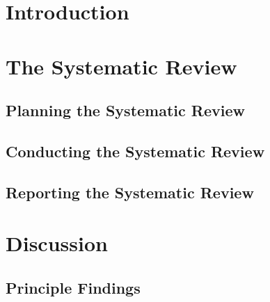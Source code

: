 \documentclass{sig-alternate}
\begin{document}
\linespread{0.87}



\linespread{0.87}
\section{Introduction}
	

%	
%		
	
\linespread{0.87}
\section{The Systematic Review}\label{method}
	
	\linespread{0.87}
	\subsection{Planning the Systematic Review\label{planning}}
		
		\linespread{0.87}
	\subsection{Conducting the Systematic Review\label{conducting}}
		
%			
\linespread{0.87}
	\subsection{Reporting the Systematic Review\label{reporting}}
		
\linespread{0.87}
\section{Discussion}
	
\linespread{0.87}
\subsection{Principle Findings} %
	
\end{document}
